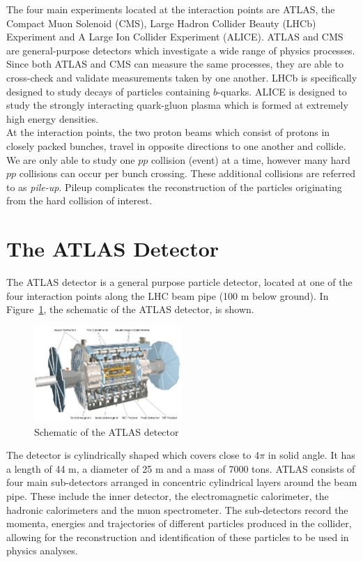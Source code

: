 The four main experiments located at the interaction points are ATLAS, the Compact Muon Solenoid (CMS), Large Hadron Collider Beauty (LHCb) Experiment and A Large Ion Collider Experiment (ALICE). ATLAS and CMS are general-purpose detectors which investigate a wide range of physics processes. Since both ATLAS and CMS can measure the same processes, they are able to cross-check and validate measurements taken by one another. LHCb is specifically designed to study decays of particles containing $b$-quarks. ALICE is designed to study the strongly interacting quark-gluon plasma which is formed at extremely high energy densities.\\

At the interaction points, the two proton beams which consist of protons in closely packed bunches, travel in opposite directions to one another and collide. We are only able to study one $pp$ collision (event) at a time, however many hard $pp$ collisions can occur per bunch crossing. These additional collisions are referred to as \textit{pile-up}. Pileup complicates the reconstruction of the particles originating from the hard collision of interest. 


\section{The ATLAS Detector}
The ATLAS detector is a general purpose particle detector, located at one of the four interaction points along the LHC beam pipe (100 m below ground). In Figure~\ref{fig:atlas-detector}, the schematic of the ATLAS detector, is shown.


\begin{figure}[h!]
 \includegraphics[width=0.5\textwidth]{figures/theoryFigs/atlasDetector.png}
 \centering
\caption{Schematic of the ATLAS detector~\cite{Collaboration_2008}}
\label{fig:atlas-detector}
\end{figure}


The detector is cylindrically shaped which covers close to 4$\pi$ in solid angle. It has a length of 44 m, a diameter of 25 m and a mass of 7000 tons. ATLAS consists of four main sub-detectors arranged in concentric cylindrical layers around the beam pipe. These include the inner detector, the electromagnetic calorimeter, the hadronic calorimeters and the muon spectrometer. The sub-detectors record the momenta, energies and trajectories of different particles produced in the collider, allowing for the reconstruction and identification of these particles to be used in physics analyses.


